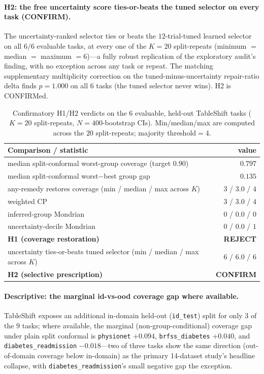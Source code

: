 \documentclass[11pt]{article}
\begin{document}
\paragraph{H2: the free uncertainty score ties-or-beats the tuned selector on every task (CONFIRM).} The
uncertainty-ranked selector ties or beats the $12$-trial-tuned learned selector on all $6/6$ evaluable
tasks, at every one of the $K{=}20$ split-repeats (minimum $=$ median $=$ maximum $=6$)---a fully robust
replication of the exploratory audit's finding, with no exception across any task or repeat. The matching
supplementary multiplicity correction on the tuned-minus-uncertainty repair-ratio delta finds $p=1.000$ on
all $6$ tasks (the tuned selector never wins). H2 is CONFIRMed.

\begin{table}[h]\centering\small
\caption{Confirmatory H1/H2 verdicts on the $6$ evaluable, held-out TableShift tasks ($K{=}20$ split-repeats,
$N{=}400$-bootstrap CIs). Min/median/max are computed across the $20$ split-repeats; majority
threshold$=4$.}\label{tab:p5verdict}
\begin{tabular}{lr}
\toprule
Comparison / statistic & value \\
\midrule
median split-conformal worst-group coverage (target $0.90$) & $0.797$ \\
median split-conformal worst$-$best group gap & $0.135$ \\
any-remedy restores coverage (min / median / max across $K$) & $3$ / $3.0$ / $4$ \\
\quad weighted CP & $3$ / $3.0$ / $4$ \\
\quad inferred-group Mondrian & $0$ / $0.0$ / $0$ \\
\quad uncertainty-decile Mondrian & $0$ / $0.0$ / $1$ \\
\textbf{H1 (coverage restoration)} & \textbf{REJECT} \\
uncertainty ties-or-beats tuned selector (min / median / max across $K$) & $6$ / $6.0$ / $6$ \\
\textbf{H2 (selective prescription)} & \textbf{CONFIRM} \\
\bottomrule
\end{tabular}
\end{table}

\paragraph{Descriptive: the marginal id-vs-ood coverage gap where available.} TableShift exposes an
additional in-domain held-out (\texttt{id\_test}) split for only $3$ of the $9$ tasks; where available, the
marginal (non-group-conditional) coverage gap under plain split conformal is \texttt{physionet} $+0.094$,
\texttt{brfss\_diabetes} $+0.040$, and \texttt{diabetes\_readmission} $-0.018$---two of three tasks show the
same direction (out-of-domain coverage below in-domain) as the primary 14-dataset study's headline collapse,
with \texttt{diabetes\_readmission}'s small negative gap the exception.
\end{document}
